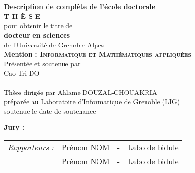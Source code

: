 \cleardoublepage

\cleardoublepage
\begin{titlepage}
\begin{center}
 \\
\vspace*{0.3cm}
 \\
\noindent \textbf{Description de complète de l'école doctorale} \\
\vspace*{0.5cm}
\noindent \Huge \textbf{T H È S E} \\
\vspace*{0.3cm}
\noindent \large {pour obtenir le titre de} \\
\vspace*{0.3cm}
\noindent \LARGE \textbf{docteur en sciences} \\
\vspace*{0.3cm}
\noindent \Large de l'Université de Grenoble-Alpes\\
\noindent \Large \textbf{Mention : \textsc{Informatique et Mathématiques appliquées}}\\
\vspace*{0.4cm}
\noindent \large {Présentée et soutenue par\\}
\noindent \LARGE Cao Tri DO \\
\vspace*{0.8cm}
 \\
\vspace*{0.8cm}
\noindent \Large Thèse dirigée par Ahlame DOUZAL-CHOUAKRIA\\
\vspace*{0.2cm}
\noindent \Large préparée au Laboratoire d'Informatique de Grenoble (LIG) \\
\vspace*{0.2cm}
\noindent \large soutenue le date de soutenance \\
\vspace*{0.5cm}
\end{center}
\noindent \large \textbf{Jury :} \\
\begin{center}
\noindent \large 
\begin{tabular}{llcl}
      \textit{Rapporteurs :}	& Prénom NOM		& - & Labo de bidule\\
                				& Prénom NOM		& - & Labo de bidule\\

\end{tabular}
\end{center}
\end{titlepage}
